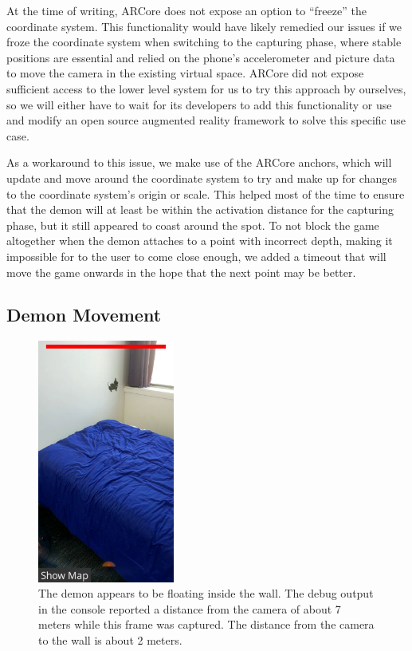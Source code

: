 At the time of writing, ARCore does not expose an option to \enquote{freeze} the coordinate system.
This functionality would have likely remedied our issues if we froze the coordinate system when switching to the capturing phase, where stable positions are essential and relied on the phone's accelerometer and picture data to move the camera in the existing virtual space.
ARCore did not expose sufficient access to the lower level system for us to try this approach by ourselves, so we will either have to wait for its developers to add this functionality or use and modify an open source augmented reality framework to solve this specific use case.

As a workaround to this issue, we make use of the ARCore anchors, which will update and move around the coordinate system to try and make up for changes to the coordinate system's origin or scale.
This helped most of the time to ensure that the demon will at least be within the activation distance for the capturing phase, but it still appeared to coast around the spot.
To not block the game altogether when the demon attaches to a point with incorrect depth, making it impossible for to the user to come close enough, we added a timeout that will move the game onwards in the hope that the next point may be better.

\subsection{Demon Movement}

\begin{figure}[ht]
    \centering
    \includegraphics[height=8cm]{graphics/demon-wrong-depth.jpg}
    \caption{The demon appears to be floating inside the wall. The debug output in the console reported a distance from the camera of about 7 meters while this frame was captured. The distance from the camera to the wall is about 2 meters.}
    \label{fig:demon_wrong_depth}
\end{figure}

